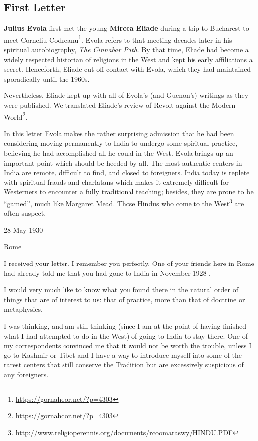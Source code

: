 \subsection{First Letter}

\begin{quotationx}
\textbf{Julius Evola} first met the young \textbf{Mircea Eliade} during a trip to Bucharest to meet Corneliu Codreanu\footnote{\url{https://gornahoor.net/?p=4303}}. Evola refers to that meeting decades later in his spiritual autobiography, \emph{The Cinnabar Path}. By that time, Eliade had become a widely respected historian of religions in the West and kept his early affiliations a secret. Henceforth, Eliade cut off contact with Evola, which they had maintained sporadically until the 1960s.

Nevertheless, Eliade kept up with all of Evola's (and Guenon's) writings as they were published. We translated Eliade's review of Revolt against the Modern World\footnote{\url{https://gornahoor.net/?p=4303}}.

In this letter Evola makes the rather surprising admission that he had been considering moving permanently to India to undergo some spiritual practice, believing he had accomplished all he could in the West. Evola brings up an important point which should be heeded by all. The most authentic centers in India are remote, difficult to find, and closed to foreigners. India today is replete with spiritual frauds and charlatans which makes it extremely difficult for Westerners to encounter a fully traditional teaching; besides, they are prone to be ``gamed'', much like Margaret Mead. Those Hindus who come to the West\footnote{\url{http://www.religioperennis.org/documents/rcoomaraswy/HINDU.PDF}} are often suspect.
\end{quotationx}


28 May 1930

Rome

I received your letter. I remember you perfectly. One of your friends here in Rome had already told me that you had gone to India in November 1928 .

I would very much like to know what you found there in the natural order of things that are of interest to us: that of practice, more than that of doctrine or metaphysics.

I was thinking, and am still thinking (since I am at the point of having finished what I had attempted to do in the West) of going to India to stay there. One of my correspondents convinced me that it would not be worth the trouble, unless I go to Kashmir or Tibet and I have a way to introduce myself into some of the rarest centers that still conserve the Tradition but are excessively suspicious of any foreigners.

